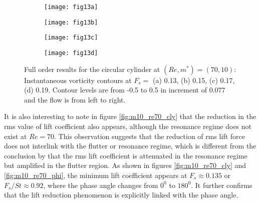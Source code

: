 \documentclass{jfm}
\begin{document}
 
\begin{figure}
\begin{subfigure}{0.495\textwidth}
\centering
    \texttt{[image: fig13a]}
    \caption{}
    \label{fig:m10_re70_vorfs013}
    \end{subfigure} 
\begin{subfigure}{0.495\textwidth} 
\centering
 \texttt{[image: fig13b]}
	\caption{}
	\label{fig:m10_re70_vorfs015}
	\end{subfigure}	
\begin{subfigure}{0.495\textwidth} 
\centering
 \texttt{[image: fig13c]}
	\caption{}
	\label{fig:m10_re70_vorfs017}
	\end{subfigure}	
\begin{subfigure}{0.495\textwidth} 
\centering
 \texttt{[image: fig13d]}
	\caption{}
	\label{fig:m10_re70_vorfs019}
	\end{subfigure}	
        \caption{Full order results for the circular cylinder at  $(Re, m^*)=(70, 10)$:
          Instantaneous vorticity contours at $F_{s} = $ (a) 0.13, (b) 0.15, (c) 0.17, (d) 0.19. 
        Contour levels are from -0.5 to 0.5 in increment of 0.077 and the flow is from left to right.}
	\label{fig:vor_fs_re70}
\end{figure}
 

It is also interesting to note in figure \ref{fig:m10_re70_cly}
that the reduction in the rms value of lift coefficient 
also appears, although the resonance regime does not exist at $Re = 70$. 
%
This observation suggests that the reduction of rms lift force does 
not interlink with the flutter or resonance regime, which is different from the 
conclusion by \cite{Zhang2015} that the rms lift coefficient is 
attenuated in the resonance regime 
but amplified in the flutter region. As shown in figures \ref{fig:m10_re70_cly} and \ref{fig:m10_re70_phi}, the
minimum lift coefficient appears at $F_s \approx 0.135$ or $F_s / St \approx 0.92$, where the phase angle changes from
$0^0$ to $180^0$. It further confirms that the lift reduction phenomenon is explicitly linked with the phase angle.
\end{document}
